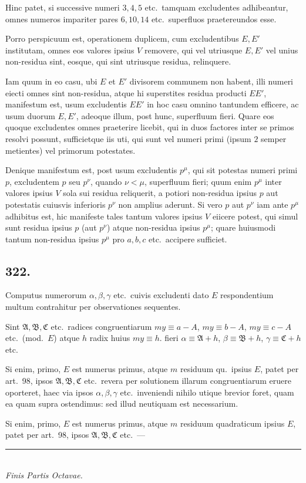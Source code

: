 \documentclass[12pt,a4paper]{article}
\theoremstyle{plain}
\theoremstyle{definition}
\theoremstyle{remark}
\begin{document}
Hinc patet, si successive numeri $3, 4, 5$ etc.\ tamquam excludentes
adhibeantur, omnes numeros impariter pares $6, 10, 14$ etc.\ superfluos
praetereundos esse.

Porro perspicuum est, operationem duplicem, cum excludentibus $E, E'$
institutam, omnes eos valores ipsius $V$ removere, qui vel utriusque $E, E'$
vel unius non-residua sint, eosque, qui sint utriusque residua, relinquere.

Iam quum in eo casu, ubi $E$ et $E'$ divisorem communem non habent,
illi numeri eiecti omnes sint non-residua, atque hi superstites residua producti
$EE'$, manifestum est, usum excludentis $EE'$ in hoc casu omnino tantundem
efficere, ac usum duorum $E, E'$, adeoque illum, post hunc, superfluum fieri.
Quare eos quoque excludentes omnes praeterire licebit, qui in duos factores
inter se primos resolvi possunt, sufficietque iis uti, qui sunt vel numeri primi
(ipsum $2$ semper metientes) vel primorum potestates.

Denique manifestum est, post usum excludentis $p^\mu$, qui sit potestas
numeri primi $p$, excludentem $p$ seu $p^\nu$, quando $\nu < \mu$, superfluum fieri;
quum enim $p^\mu$ inter valores ipsius $V$ sola sui residua reliquerit, a potiori
non-residua ipsius $p$ aut potestatis cuiusvis inferioris $p^\nu$ non amplius aderunt.
Si vero $p$ aut $p^\nu$ iam ante $p^\mu$ adhibitus est, hic manifeste tales tantum
valores ipsius $V$ eiicere potest, qui simul sunt residua ipsius $p$ (aut $p^\nu$) atque
non-residua ipsius $p^\mu$; quare huiusmodi tantum non-residua ipsius $p^\mu$ pro
$a, b, c$ etc.\ accipere sufficiet.

\subsection*{322.}

Computus numerorum $\alpha, \beta, \gamma$ etc.\ cuivis excludenti dato $E$
respondentium multum contrahitur per observationes sequentes.

Sint $\mathfrak{A}, \mathfrak{B}, \mathfrak{C}$ etc.\ radices congruentiarum $my \equiv a - A$,
$my \equiv b - A$, $my \equiv c - A$ etc.\ (mod.\ $E$) atque $h$ radix huius $my \equiv h$.
fieri $\alpha \equiv \mathfrak{A} + h$, $\beta \equiv \mathfrak{B} + h$, $\gamma \equiv \mathfrak{C} + h$ etc.

Si enim, primo, $E$ est numerus primus, atque $m$ residuum qu.\ ipsius
$E$, patet per art.\@~98, ipsos $\mathfrak{A}, \mathfrak{B}, \mathfrak{C}$ etc.\ revera per solutionem illarum
congruentiarum eruere oporteret, haec via ipsos $\alpha, \beta, \gamma$ etc.\ inveniendi nihilo
utique brevior foret, quam ea quam supra ostendimus: sed illud neutiquam est
necessarium.

Si enim, primo, $E$ est numerus primus, atque $m$ residuum quadraticum
ipsius $E$, patet per art.\@~98, ipsos $\mathfrak{A}, \mathfrak{B}, \mathfrak{C}$ etc.\ ---

\vfill
\begin{center}
\rule{0.5\textwidth}{0.4pt}\\[0.5em]
\textit{Finis Partis Octavae.}
\end{center}
\end{document}
